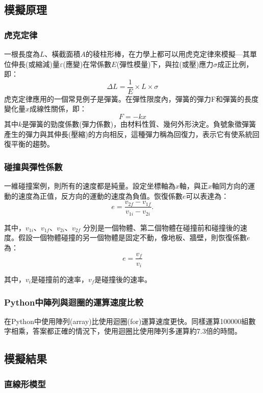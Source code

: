 \documentclass[11pt,twoside,b5paper]{article}
\begin{document}
\subsection{模擬原理}

\subsubsection{虎克定律 \cite{Hooke}}
    一根長度為$L$、橫截面積$A$的稜柱形棒，在力學上都可以用虎克定律來模擬—其單位伸長(或縮減)量$\varepsilon$(應變)在常係數$Ε$(彈性模量)下，與拉(或壓)應力$\sigma$成正比例，即：
    \[
        \Delta L=\frac{1}{E}\times L\times \sigma
    \]
    虎克定律應用的一個常見例子是彈簧。在彈性限度內，彈簧的彈力F和彈簧的長度變化量$x$成線性關係，即：
    \[
        F=-kx
    \]
    其中$k$是彈簧的勁度係數(彈力係數)，由材料性質、幾何外形決定。負號象徵彈簧產生的彈力與其伸長(壓縮)的方向相反，這種彈力稱為回復力，表示它有使系統回復平衡的趨勢。

\subsubsection{	碰撞與彈性係數 \cite{Re}}

一維碰撞案例，則所有的速度都是純量。設定坐標軸為$x$軸，與正$x$軸同方向的運動的速度為正值，反方向的運動的速度為負值。恢復係數$e$可以表達為：
    \[
        e=\frac{v_{2f}-v_{1f}}{v_{1i}-v_{2i}}.
    \]

其中，$v_{1i}$、$v_{1f}$、$v_{2i}$、$v_{2f}$ 分別是一個物體、第二個物體在碰撞前和碰撞後的速度。假設一個物體碰撞的另一個物體是固定不動，像地板、牆壁，則恢復係數$e$為：
\[
    e=\frac{v_f}{v_i}
\]

其中，$v_i$是碰撞前的速率，$v_f$是碰撞後的速率。

\subsubsection{Python中陣列與迴圈的運算速度比較 \cite{Py} }

在Python中使用陣列(array)比使用迴圈(for)運算速度更快。同樣運算100000組數字相乘，答案都正確的情況下，使用迴圈比使用陣列多運算約7.3倍的時間。

\subsection{模擬結果}

\subsubsection{直線形模型}
\end{document}
